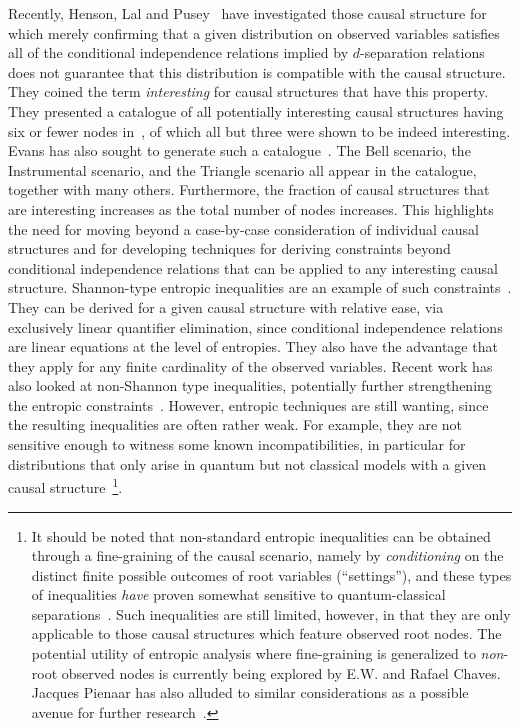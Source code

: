 \documentclass[aps,english,10pt,superscriptaddress,onecolumn,twoside,longbibliography,pra,floatfix,fleqn,nofootinbib]{revtex4-1}
\theoremstyle{definition}
\newcounter{example}[section]
\begin{document}
Recently, Henson, Lal and Pusey~\cite{pusey2014gdag} have investigated those causal structure for which merely confirming that a given distribution on observed variables satisfies all of the conditional independence relations implied by $d$-separation relations does not guarantee that this distribution is compatible with the causal structure.  They coined the term \emph{interesting} for causal structures that have this property. They presented a catalogue of all potentially interesting causal structures having six or fewer nodes in~\cite[App.~E]{pusey2014gdag}, of which all but three were shown to be indeed interesting. Evans has also sought to generate such a catalogue~\cite{evans2012graphical}. The Bell scenario, the Instrumental scenario, and the Triangle scenario all appear in the catalogue, together with many others.   Furthermore, the fraction of causal structures that are interesting increases as the total number of nodes increases.  This highlights the need for moving beyond a case-by-case consideration of individual causal structures and for developing techniques for deriving constraints beyond conditional independence relations that can be applied to any interesting causal structure. 
Shannon-type entropic inequalities are an example of such constraints~\cite{steudel2010ancestors,fritz2012bell,fritz2013marginal,chaves2014novel,chaves2014informationinference}. They can be derived for a given causal structure with relative ease, via exclusively linear quantifier elimination, since conditional independence relations are linear equations at the level of entropies. They also have the advantage that they apply for any finite cardinality of the observed variables. Recent work has also looked at non-Shannon type inequalities, potentially further strengthening the entropic constraints~\cite{weilenmann2016entropic,pianaar2016interesting}. However, entropic techniques are still wanting, since the resulting inequalities are often rather weak. For example, they are not sensitive enough to witness some known incompatibilities, in particular for distributions that only arise in quantum but not classical models with a given causal structure~\cite{fritz2012bell,weilenmann2016entropic}\footnote{It should be noted that non-standard entropic inequalities can be obtained through a fine-graining of the causal scenario, namely by \emph{conditioning} on the distinct finite possible outcomes of root variables (``settings''), and these types of inequalities \emph{have} proven somewhat sensitive to quantum-classical separations~\cite{braunstein1988entropic,SchumacherInequality,chaves2014novel}. Such inequalities are still limited, however, in that they are only applicable to those causal structures which feature observed root nodes. The potential utility of entropic analysis where fine-graining is generalized to \emph{non}-root observed nodes is currently being explored by E.W. and Rafael Chaves. Jacques Pienaar has also alluded to similar considerations as a possible avenue for further research~\cite{pianaar2016interesting}.}.
\end{document}
